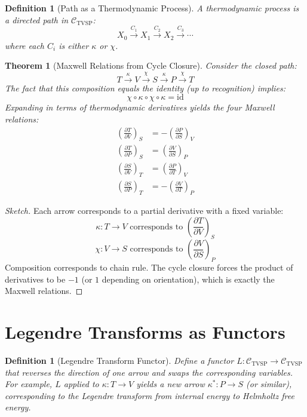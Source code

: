 \documentclass[12pt]{article}
\newtheorem{definition}[axiom]{Definition}
\newtheorem{theorem}[axiom]{Theorem}
\begin{document}
\begin{definition}[Path as a Thermodynamic Process]
A thermodynamic process is a directed path in \(\mathcal{C}_{\text{TVSP}}\):
\[
X_0 \xrightarrow{C_1} X_1 \xrightarrow{C_2} X_2 \xrightarrow{C_3} \cdots
\]
where each \(C_i\) is either \(\kappa\) or \(\chi\).
\end{definition}

\begin{theorem}[Maxwell Relations from Cycle Closure]
Consider the closed path:
\[
T \xrightarrow{\kappa} V \xrightarrow{\chi} S \xrightarrow{\kappa} P \xrightarrow{\chi} T
\]
The fact that this composition equals the identity (up to recognition) implies:
\[
\chi \circ \kappa \circ \chi \circ \kappa = \text{id}
\]
Expanding in terms of thermodynamic derivatives yields the four Maxwell relations:
\[
\begin{aligned}
\left(\frac{\partial T}{\partial V}\right)_S &= -\left(\frac{\partial P}{\partial S}\right)_V \\
\left(\frac{\partial T}{\partial P}\right)_S &= \left(\frac{\partial V}{\partial S}\right)_P \\
\left(\frac{\partial S}{\partial V}\right)_T &= \left(\frac{\partial P}{\partial T}\right)_V \\
\left(\frac{\partial S}{\partial P}\right)_T &= -\left(\frac{\partial V}{\partial T}\right)_P
\end{aligned}
\]
\end{theorem}

\begin{proof}[Sketch]
Each arrow corresponds to a partial derivative with a fixed variable:
\[
\kappa: T \to V \text{ corresponds to } \left(\frac{\partial T}{\partial V}\right)_S
\]
\[
\chi: V \to S \text{ corresponds to } \left(\frac{\partial V}{\partial S}\right)_P
\]
Composition corresponds to chain rule. The cycle closure forces the product of derivatives to be \(-1\) (or \(1\) depending on orientation), which is exactly the Maxwell relations.
\end{proof}

\section{Legendre Transforms as Functors}

\begin{definition}[Legendre Transform Functor]
Define a functor \(L: \mathcal{C}_{\text{TVSP}} \to \mathcal{C}_{\text{TVSP}}\) that reverses the direction of one arrow and swaps the corresponding variables.
For example, \(L\) applied to \(\kappa: T \to V\) yields a new arrow \(\kappa^*: P \to S\) (or similar), corresponding to the Legendre transform from internal energy to Helmholtz free energy.
\end{definition}
\end{document}
